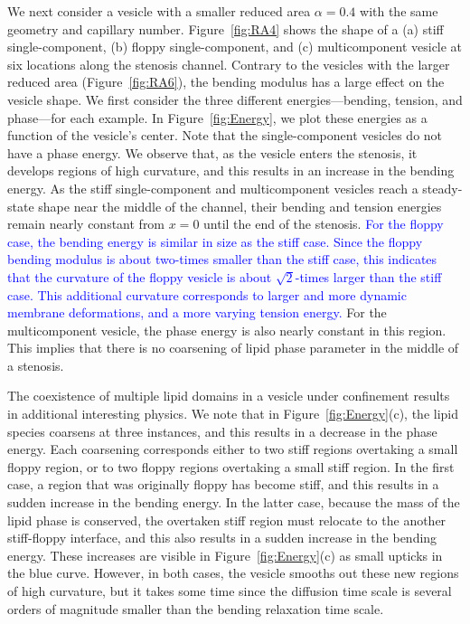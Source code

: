 \documentclass[twoside,twocolumn,9pt]{article}
\begin{document}
We next consider a vesicle with a smaller reduced area $\alpha=0.4$ with
the same geometry and capillary number. Figure~\ref{fig:RA4} shows the
shape of a (a) stiff single-component, (b) floppy single-component, and
(c) multicomponent vesicle at six locations along the stenosis channel.
Contrary to the vesicles with the larger reduced area
(Figure~\ref{fig:RA6}), the bending modulus has a large effect on the
vesicle shape. We first consider the three different energies---bending,
tension, and phase---for each example. In Figure~\ref{fig:Energy}, we
plot these energies as a function of the vesicle's center. Note that the
single-component vesicles do not have a phase energy. We observe that,
as the vesicle enters the stenosis, it develops regions of high
curvature, and this results in an increase in the bending energy. As
the stiff single-component and multicomponent vesicles reach a
steady-state shape near the middle of the channel, their bending and
tension energies remain nearly constant from $x=0$ until the end of the
stenosis. 
\textcolor{blue}{
For the floppy case, the bending energy is similar in size as the stiff
case. Since the floppy bending modulus is about two-times smaller than the
stiff case, this indicates that the curvature of the floppy vesicle is
about $\sqrt{2}$-times larger than the stiff case. This additional
curvature corresponds to larger and more dynamic membrane deformations,
and a more varying tension energy.}
For the multicomponent vesicle, the phase energy is also nearly constant
in this region. This implies that there is no coarsening of lipid phase
parameter in the middle of a stenosis.

The coexistence of multiple lipid domains in a vesicle under confinement
results in additional interesting physics. We note that in
Figure~\ref{fig:Energy}(c), the lipid species coarsens at three
instances, and this results in a decrease in the phase energy. Each
coarsening corresponds either to two stiff regions overtaking a small
floppy region, or to two floppy regions overtaking a small stiff region.
In the first case, a region that was originally floppy has become stiff,
and this results in a sudden increase in the bending energy. In the
latter case, because the mass of the lipid phase is conserved, the
overtaken stiff region must relocate to the another stiff-floppy
interface, and this also results in a sudden increase in the bending
energy. These increases are visible in Figure~\ref{fig:Energy}(c) as
small upticks in the blue curve. However, in both cases, the vesicle
smooths out these new regions of high curvature, but it takes some time
since the diffusion time scale is several orders of magnitude smaller
than the bending relaxation time scale.
\end{document}
